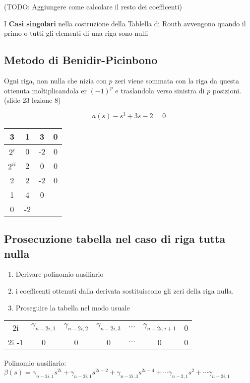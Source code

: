 \documentclass{article}
\begin{document}
(TODO: Aggiungere come calcolare il resto dei coefficenti)

I \textbf{Casi singolari} nella costruzione della Tablella di Routh avvengono quando il primo o tutti gli elementi di una riga sono nulli

\subsection{Metodo di Benidir-Picinbono}
Ogni riga, non nulla che nizia con $p$ zeri viene sommata con la riga da questa ottenuta moltiplicandola er $(-1)^p$ e traslandola verso sinistra di $p$ posizioni. (slide 23 lezione 8)

\[ a(s) - s^3 + 3s -2 = 0 \]
\begin{center}
    \begin{tabular} {c|c c c}
        3 & 1 & 3 & 0\\
        \hline
        $2^i$ & 0 & -2 & 0\\
        $2^{ii}$ & 2 & 0 & 0\\
        \hline
        2 & 2 & -2 & 0\\
        1 & 4 & 0\\
        0 & -2
\end{tabular}
\end{center}

\subsection{Prosecuzione tabella nel caso di riga tutta nulla}

\begin{enumerate}
    \item Derivare polinomio ausiliario
    \item i coefficenti ottenuti dalla derivata sostituiscono gli zeri della riga nulla.
    \item Proseguire la tabella nel modo usuale
\end{enumerate}

\begin{center}
\begin{tabular}{c|c c c c c c}
    2i & $\gamma_{n-2i,1}$ & $\gamma_{n-2i,2}$ & $\gamma_{n-2i,3}$  & $\cdots$ & $\gamma_{n-2i,i+1}$  & 0 \\
    2i -1 & 0 & 0 & 0 & $\cdots$ & 0 & 0
\end{tabular}
\end{center}

Polinomio ausiliario:
$ \beta(s) = \gamma_{n-2i,1} s^{2i} + \gamma_{n-2i,1} s^{2i-2} +\gamma_{n-2i,3} s^{2i - 4}  + \cdots \gamma_{n-2,1} s^{2} +  \cdots \gamma_{n-2i,1} $
\end{document}
